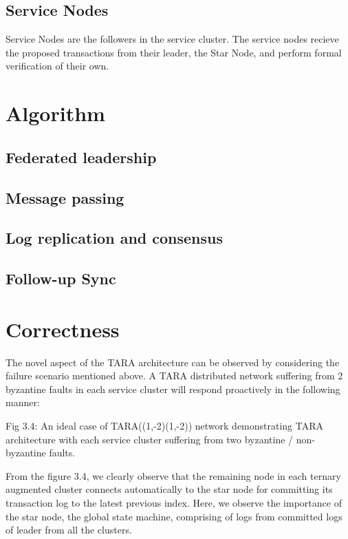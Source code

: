 \documentclass[]{article}
\begin{document}
\subsection{Service Nodes}
Service Nodes are the followers in the service cluster. 
The service nodes recieve the proposed transactions from their leader, the Star Node, and perform formal verification of their own.

\section{Algorithm}

\subsection{Federated leadership}

\subsection{Message passing}

\subsection{Log replication and consensus}

\subsection{Follow-up Sync}

\section{Correctness}
The novel aspect of the TARA architecture can be observed by considering the failure scenario mentioned above. A TARA distributed network suffering from 2 byzantine faults in each service cluster will respond proactively in the following manner:


Fig 3.4: An ideal case of TARA((1,-2)(1,-2)) network demonstrating TARA architecture with each service cluster suffering from two byzantine / non-byzantine faults.

From the figure 3.4, we clearly observe that the remaining node in each ternary augmented cluster connects automatically to the star node for committing its transaction log to the latest previous index. Here, we observe the importance of the star node, the global state machine, comprising of logs from committed logs of leader from all the clusters.
\end{document}
